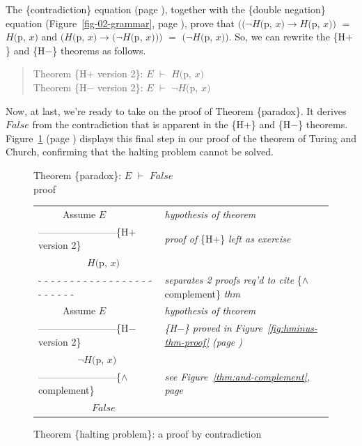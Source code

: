 The \{contradiction\} equation (page \pageref{boolean-contradiction}),
together with the \{double negation\} equation
(Figure~\ref{fig-02-grammar}, page \pageref{fig-02-grammar}),
prove that
$((\neg H($\textsf{p}, $x) \rightarrow H($\textsf{p}, $x))$ $=$ $H($\textsf{p}, $x)$
and
$(H($\textsf{p}, $x) \rightarrow (\neg H($\textsf{p}, $x)))$ $=$ $(\neg H($\textsf{p}, $x))$.
So, we can rewrite the \{H$+$\} and \{H$-$\} theorems as follows.
\begin{quote}
\label{thm:HplusHminus}
Theorem \{H$+$ version 2\}: $E$ $\vdash$ $H($\textsf{p}, $x)$ \\
Theorem \{H$-$ version 2\}: $E$ $\vdash$ $\neg H($\textsf{p}, $x)$
\end{quote}

Now, at last, we're ready to take on
the proof of Theorem \{paradox\}.
It derives $False$ from the contradiction that is apparent
in the \{H$+$\} and \{H$-$\} theorems.
Figure~\ref{fig:proof-paradox-thm} (page \pageref{fig:proof-paradox-thm})
displays this final step in our proof
of the theorem of Turing and Church,
confirming that the halting problem cannot be solved.

\begin{figure}
Theorem \{paradox\}: $E$ $\vdash$ $False$\\
proof
\begin{center}
\begin{tabular}{ll}
~~~~~Assume $E$                                 &\emph{hypothesis of theorem}\\
------------------------\{H$+$ version 2\}      &\emph{proof of} \{H$+$\} \emph{left as exercise}\\
~~~~~~~~~~$H($\textsf{p}, $x)$                  &\\
 - - - - - - - - - - - - - - - - - - - - - - - -&\emph{separates 2 proofs req'd to cite} \{$\wedge$ complement\} \emph{thm}\\
~~~~~Assume $E$                                 &\emph{hypothesis of theorem}\\
------------------------\{H$-$ version 2\}      &\emph{\{H$-$\} proved in Figure~\ref{fig:hminus-thm-proof} (page \pageref{fig:hminus-thm-proof})}\\
~~~~~~~~$\neg H($\textsf{p}, $x)$               &\\
------------------------\{$\wedge$ complement\} &\emph{see Figure~\ref{thm:and-complement}, page \pageref{thm:and-complement}}\\
~~~~~~~~~~~$False$                              &\\
\end{tabular}
\end{center}
\caption{Theorem \{halting problem\}: a proof by contradiction}
\label{fig:proof-paradox-thm}
\end{figure}

